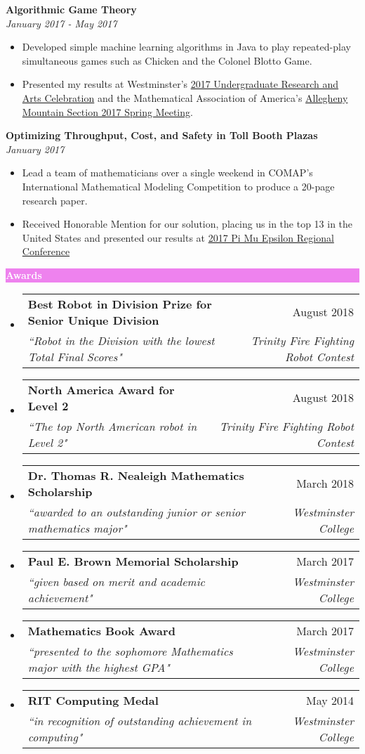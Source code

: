 \documentclass[letterpaper,11pt]{article}
\makeatletter
\newcommand{\resitem}[1]{\item #1 \vspace{-2pt}}
\newcommand{\resheading}[1]{{\large \colorbox{violet}{\begin{minipage}{\textwidth}{\textbf{#1 \vphantom{p\^{E}}}}\end{minipage}}}}
\newcommand{\ressubheading}[4]{
	\begin{tabular*}{7.0in}{l@{\extracolsep{\fill}}r}
		\textbf{#1} & #2 \\
		\textit{#3} & \textit{#4} \\
	\end{tabular*}\vspace{-6pt}}
\makeatother
\begin{document}
		\textbf{Algorithmic Game Theory} \\ \textit{January 2017 - May 2017}
		\begin{itemize}[topsep=3pt, itemsep=1pt]
			\resitem{Developed simple machine learning algorithms in Java to play repeated-play simultaneous games such as Chicken and the Colonel Blotto Game.}
			\resitem{Presented my results at Westminster's \href{https://alexandermichels.github.io/docs/2017-urac-schedule.pdf}{2017 Undergraduate Research and Arts Celebration} and the Mathematical Association of America's \href{https://alexandermichels.github.io/docs/MAA2017Abstracts.pdf}{Allegheny Mountain Section 2017 Spring Meeting}.}
		\end{itemize}
	
		\textbf{Optimizing Throughput, Cost, and Safety in Toll Booth Plazas} \\ \textit{January 2017}
		\begin{itemize}[topsep=3pt, itemsep=1pt]
			\resitem{Lead a team of mathematicians over a single weekend in COMAP's International Mathematical Modeling Competition to produce a 20-page research paper.}
			\resitem{Received Honorable Mention for our solution, placing us in the top 13 in the United States and presented our results at \href{https://alexandermichels.github.io/docs/PME2017Program.pdf}{2017 Pi Mu Epsilon Regional Conference}}
		\end{itemize}
	
		\resheading{\textcolor{white}{Awards}}

		\begin{itemize}[topsep=3pt, itemsep=1pt]
			\item
			\ressubheading{Best Robot in Division Prize for Senior Unique Division}{August 2018}{``Robot in the Division with the lowest Total Final Scores"}{Trinity Fire Fighting Robot Contest}
			\item
			\ressubheading{North America Award for Level 2}{August 2018}{``The top North American robot in Level 2"}{Trinity Fire Fighting Robot Contest}
			\item
			\ressubheading{Dr. Thomas R. Nealeigh Mathematics Scholarship}{March 2018}{``awarded to an outstanding junior or senior mathematics major"}{Westminster College}
			\item
			\ressubheading{Paul E. Brown Memorial Scholarship}{March 2017}{``given based on merit and academic achievement"}{Westminster College}
			\item
			\ressubheading{Mathematics Book Award}{March 2017}{``presented to the sophomore Mathematics major with the highest GPA"}{Westminster College}
			\item
			\ressubheading{RIT Computing Medal}{May 2014}{``in recognition of outstanding achievement in computing"}{Westminster College}
		\end{itemize}
	
\end{document}
